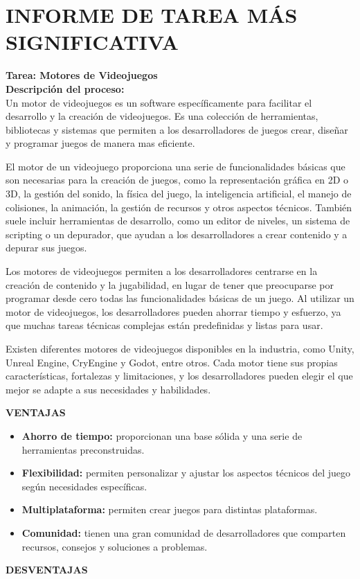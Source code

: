 \section*{\centering\large{INFORME DE TAREA MÁS SIGNIFICATIVA}}

\textbf{Tarea: Motores de Videojuegos}\\ 

\textbf{Descripción del proceso:}\\ 

Un motor de videojuegos es un software específicamente para facilitar el desarrollo y la creación de videojuegos. Es una colección de herramientas, bibliotecas y sistemas que permiten a los desarrolladores de juegos crear, diseñar y programar juegos de manera mas eficiente.

El motor de un videojuego proporciona una serie de funcionalidades básicas que son necesarias para la creación de juegos, como la representación gráfica en 2D o 3D, la gestión del sonido, la física del juego, la inteligencia artificial, el manejo de colisiones, la animación, la gestión de recursos y otros aspectos técnicos. También suele incluir herramientas de desarrollo, como un editor de niveles, un sistema de scripting o un depurador, que ayudan a los desarrolladores a crear contenido y a depurar sus juegos.

Los motores de videojuegos permiten a los desarrolladores centrarse en la creación de contenido y la jugabilidad, en lugar de tener que preocuparse por programar desde cero todas las funcionalidades básicas de un juego. Al utilizar un motor de videojuegos, los desarrolladores pueden ahorrar tiempo y esfuerzo, ya que muchas tareas técnicas complejas están predefinidas y listas para usar.

Existen diferentes motores de videojuegos disponibles en la industria, como Unity, Unreal Engine, CryEngine y Godot, entre otros. Cada motor tiene sus propias características, fortalezas y limitaciones, y los desarrolladores pueden elegir el que mejor se adapte a sus necesidades y habilidades.

\textbf{VENTAJAS}

\begin{itemize}
	\item \textbf{Ahorro de tiempo:} proporcionan una base sólida y una serie de herramientas preconstruidas.
	
	\item \textbf{Flexibilidad:} permiten personalizar y ajustar los aspectos técnicos del juego según necesidades específicas.
	
	\item\textbf{Multiplataforma:} permiten crear juegos para distintas plataformas.
	
	\item\textbf{Comunidad:} tienen una gran comunidad de desarrolladores que comparten recursos, consejos y soluciones a problemas.
\end{itemize}
\newpage
\textbf{DESVENTAJAS}

